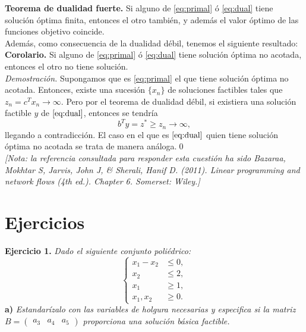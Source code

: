 \documentclass[11pt,a4paper]{article}
\begin{document}
\textbf{Teorema de dualidad fuerte.} Si alguno de \eqref{eq:primal} ó \eqref{eq:dual} tiene solución óptima finita, entonces el otro también, y además el valor óptimo de las funciones objetivo coincide.\\

Además, como consecuencia de la dualidad débil, tenemos el siguiente resultado:\\

\textbf{Corolario.} Si alguno de \eqref{eq:primal} ó \eqref{eq:dual} tiene solución óptima no acotada, entonces el otro no tiene solución.\\

\textit{Demostración.} Supongamos que es \eqref{eq:primal} el que tiene solución óptima no acotada. Entonces, existe una sucesión $\{x_n\}$ de soluciones factibles tales que $z_n=c^Tx_n \to \infty$. Pero por el teorema de dualidad débil, si existiera una solución factible $y$ de $\eqref{eq:dual}$, entonces se tendría
\[
 b^T y = z^\ast \geq z_n \to \infty,
\]
llegando a contradicción. El caso en el que es $\eqref{eq:dual}$ quien tiene solución óptima no acotada se trata de manera análoga.\qed\\

\textit{[Nota: la referencia consultada para responder esta cuestión ha sido Bazaraa, Mokhtar S, Jarvis, John J, & Sherali, Hanif D. (2011). Linear programming and network flows (4th ed.). Chapter 6. Somerset: Wiley.]}

\newpage

\section*{Ejercicios}

\textbf{Ejercicio 1.} \emph{Dado el siguiente conjunto poliédrico:}
        \[
        \begin{cases}
          x_{1} - x_{2} &\leq 0,\\
          x_{2} &\leq 2,\\
          x_{1} &\geq 1,\\
          x_{1}, x_{2} &\geq 0.
          \end{cases}
        \]
\textbf{a)} \emph{Estandarízalo con las variables de holgura necesarias y especifica si la matriz \( B = \begin{pmatrix} a_{3} & a_{4} & a_{5} \end{pmatrix} \) proporciona una solución básica factible.}\\
\end{document}
